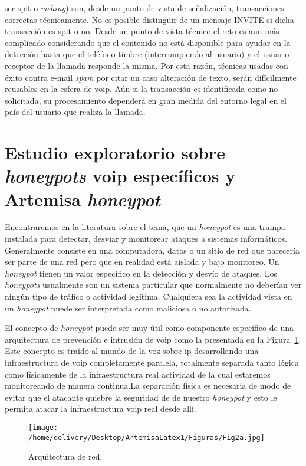 \documentclass[a4paper,12pt]{report}
\begin{document}
\begin{itemize}
ser \ac{spit} o \emph{vishing}) son, desde un punto de vista de señalización, transacciones
correctas técnicamente. No es posible distinguir de un mensaje INVITE si dicha
transacción es \ac{spit} o no. Desde un punto de vista técnico el reto es aun más
complicado  considerando que el contenido no está disponible para ayudar en la
detección hasta que el teléfono timbre (interrumpiendo al usuario) y el
usuario receptor de la llamada responde la misma. Por esta razón, técnicas
usadas con éxito contra e-mail \emph{spam} por citar un caso alteración de texto, serán
difícilmente reusables en la esfera de \ac{voip}. Aún si la transacción es
identificada como no solicitada, su procesamiento dependerá en gran medida del
entorno legal en el país del usuario que realiza la llamada.
\end{itemize}

\section{Estudio exploratorio sobre \emph{honeypots} \ac{voip} específicos y Artemisa \emph{honeypot}}
\label{honeypot_artemisa}

Encontraremos en la literatura sobre el tema, que un \emph{honeypot} es una trampa
instalada para detectar, desviar y monitorear ataques a sistemas informáticos.
Generalmente consiste en una computadora, datos o un sitio de red que parecería
ser parte de una red pero que en realidad está aislada y bajo monitoreo. Un
\emph{honeypot} tienen un valor específico en la detección y desvío de ataques. Los
\emph{honeypots} usualmente son un sistema particular que normalmente no deberían ver
ningún tipo de tráfico o actividad legítima. Cualquiera sea la actividad vista
en un \emph{honeypot} puede ser interpretada como maliciosa o no autorizada. 

El concepto de \emph{honeypot} puede ser muy útil como componente específico de una
arquitectura de prevención e intrusión de \ac{voip} como la presentada en 
la Figura~\ref{arquitectura_de_red_sip}.
Este concepto es traído al mundo de la voz sobre \ac{ip} desarrollando una infraestructura de \ac{voip}
completamente paralela, totalmente separada tanto lógica como físicamente de
la infraestructura real actividad de la cual estaremos monitoreando de manera
continua.La separación física es necesaria de modo de evitar que el atacante
quiebre la seguridad de de nuestro \emph{honeypot} y esto le permita atacar la
infraestructura \ac{voip} real desde allí. 

\begin{figure}[h!] 
\centering
\texttt{[image: /home/delivery/Desktop/ArtemisaLatex1/Figuras/Fig2a.jpg]}
\caption{Arquitectura de red. \cite{ewaldt}}
\label{arquitectura_de_red_sip}
\end{figure}
\end{document}
